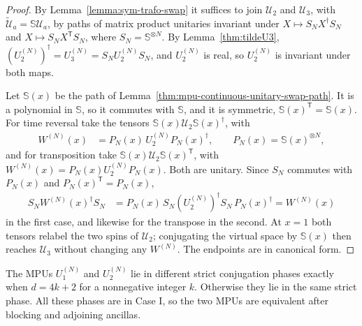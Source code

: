 \begin{proof}
    \leanok
    By Lemma~\ref{lemma:sym-trafo-swap} it suffices to join
    $\mathcal U_2$ and $\mathcal U_3$, with
    $\widetilde{\mathcal U}_a=\mathbb S\mathcal U_a$, by paths of matrix product unitaries invariant under
    $X\mapsto S_NX^\dagger S_N$ and $X\mapsto S_NX^{\mathsf T}S_N$, where
    $S_N=\mathbb S^{\otimes N}$. By Lemma~\ref{thm:tildeU3},
    $(U_2^{(N)})^\dagger=U_3^{(N)}=S_NU_2^{(N)}S_N$, and $U_2^{(N)}$ is real,
    so $U_2^{(N)}$ is invariant under both maps.

    Let $\mathbb S(x)$ be the path of
    Lemma~\ref{thm:mpu-continuous-unitary-swap-path}. It is a polynomial in
    $\mathbb S$, so it commutes with $\mathbb S$, and it is symmetric,
    $\mathbb S(x)^{\mathsf T}=\mathbb S(x)$. For time reversal take the tensors
    $\mathbb S(x)\mathcal U_2\mathbb S(x)^\dagger$, with
    \begin{align}
        W^{(N)}(x) & =P_N(x)\,U_2^{(N)}P_N(x)^\dagger,
        \qquad P_N(x)=\mathbb S(x)^{\otimes N},
    \end{align}
    and for transposition take
    $\mathbb S(x)\mathcal U_2\mathbb S(x)^{\mathsf T}$, with
    $W^{(N)}(x)=P_N(x)U_2^{(N)}P_N(x)$. Both are unitary. Since
    $S_N$ commutes with $P_N(x)$ and $P_N(x)^{\mathsf T}=P_N(x)$,
    \begin{align}
        S_NW^{(N)}(x)^\dagger S_N
         & =P_N(x)\,S_N(U_2^{(N)})^\dagger S_N\,P_N(x)^\dagger
        =W^{(N)}(x)
    \end{align}
    in the first case, and likewise for the transpose in the second. At $x=1$
    both tensors relabel the two spins of $\mathcal U_2$; conjugating the
    virtual space by $\mathbb S(x)$ then reaches $\mathcal U_3$ without
    changing any $W^{(N)}$. The endpoints are in canonical form.
\end{proof}

\begin{lemma}
    \label{prop:eqiv-U1-U2-conjugate}
    \notready
    The MPUs $U_1^{(N)}$ and $U_2^{(N)}$ lie in different strict conjugation
    phases exactly when $d=4k+2$ for a nonnegative integer $k$. Otherwise they
    lie in the same strict phase. All these phases are in Case I, so the two
    MPUs are equivalent after blocking and adjoining ancillas.
\end{lemma}

